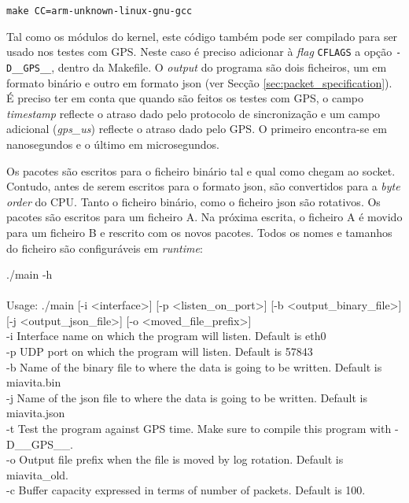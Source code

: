 \documentclass[10pt,a4paper,oneside]{book}
\begin{document}
    \begin{flushleft}
      {\tt make CC=arm-unknown-linux-gnu-gcc}
    \end{flushleft}

    Tal como os módulos do kernel, este código também pode ser compilado para ser usado nos testes com GPS. Neste caso é preciso adicionar à \emph{flag} {\tt CFLAGS} a opção {\tt -D\_\_GPS\_\_}, dentro da Makefile. O \emph{output} do programa são dois ficheiros, um em formato binário e outro em formato json (ver Secção \ref{sec:packet_specification}). É preciso ter em conta que quando são feitos os testes com GPS, o campo \emph{timestamp} reflecte o atraso dado pelo protocolo de sincronização e um campo adicional (\emph{gps\_us}) reflecte o atraso dado pelo GPS. O primeiro encontra-se em nanosegundos e o último em microsegundos.

    Os pacotes são escritos para o ficheiro binário tal e qual como chegam ao socket. Contudo, antes de serem escritos para o formato json, são convertidos para a \emph{byte order} do CPU. Tanto o ficheiro binário, como o ficheiro json são rotativos. Os pacotes são escritos para um ficheiro A. Na próxima escrita, o ficheiro A é movido para um ficheiro B e rescrito com os novos pacotes. Todos os nomes e tamanhos do ficheiro são configuráveis em \emph{runtime}:

    \begin{flushleft}
      ./main -h\\\hfill\\
      Usage: ./main [-i <interface>] [-p <listen\_on\_port>] [-b <output\_binary\_file>] [-j <output\_json\_file>] [-o <moved\_file\_prefix>]\\
      -i Interface name on which the program will listen. Default is eth0\\
      -p UDP port on which the program will listen. Default is 57843\\
      -b Name of the binary file to where the data is going to be written. Default is miavita.bin\\
      -j Name of the json file to where the data is going to be written. Default is miavita.json\\
      -t Test the program against GPS time. Make sure to compile this program with -D\_\_GPS\_\_.\\
      -o Output file prefix when the file is moved by log rotation. Default is miavita\_old.\\
      -c Buffer capacity expressed in terms of number of packets. Default is 100.
    \end{flushleft}
\end{document}
